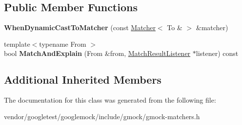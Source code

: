 \subsection*{Public Member Functions}
\begin{DoxyCompactItemize}
\item 
{\bfseries When\+Dynamic\+Cast\+To\+Matcher} (const \hyperlink{classtesting_1_1Matcher}{Matcher}$<$ To \& $>$ \&matcher)\hypertarget{classtesting_1_1internal_1_1WhenDynamicCastToMatcher_3_01To_01_6_01_4_a5f292f9497d2da8484082cba38053908}{}\label{classtesting_1_1internal_1_1WhenDynamicCastToMatcher_3_01To_01_6_01_4_a5f292f9497d2da8484082cba38053908}

\item 
{\footnotesize template$<$typename From $>$ }\\bool {\bfseries Match\+And\+Explain} (From \&from, \hyperlink{classtesting_1_1MatchResultListener}{Match\+Result\+Listener} $\ast$listener) const \hypertarget{classtesting_1_1internal_1_1WhenDynamicCastToMatcher_3_01To_01_6_01_4_a5459ff45c7b687d42545490226c2f7b2}{}\label{classtesting_1_1internal_1_1WhenDynamicCastToMatcher_3_01To_01_6_01_4_a5459ff45c7b687d42545490226c2f7b2}

\end{DoxyCompactItemize}
\subsection*{Additional Inherited Members}


The documentation for this class was generated from the following file\+:\begin{DoxyCompactItemize}
\item 
vendor/googletest/googlemock/include/gmock/gmock-\/matchers.\+h\end{DoxyCompactItemize}
